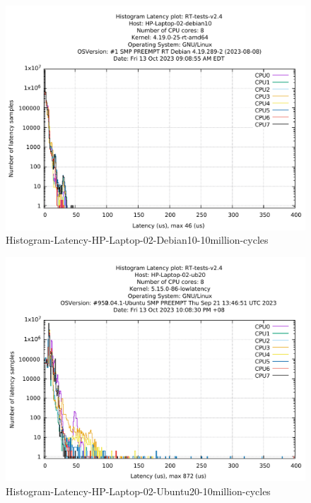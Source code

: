 \clearpage
\pagebreak

\begin{figure}
\caption{Histogram-Latency-HP-Laptop-02-Debian10-10million-cycles}
\label  {Histogram-Latency-HP-Laptop-02-Debian10-10million-cycles.pdf}
\centering
\includegraphics[width=1.00\textwidth]{Chap3/app-realtime/Histogram-Latency-HP-Laptop-02-Debian10-10million-cycles.pdf} 
\end{figure}	

\begin{figure}
\caption{Histogram-Latency-HP-Laptop-02-Ubuntu20-10million-cycles}
\label  {Histogram-Latency-HP-Laptop-02-Ubuntu20-10million-cycles.pdf}
\centering
\includegraphics[width=1.00\textwidth]{Chap3/app-realtime/Histogram-Latency-HP-Laptop-02-Ubuntu20-10million-cycles.pdf} 
\end{figure}	


